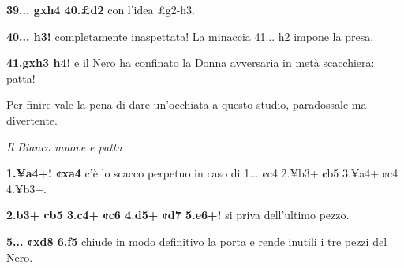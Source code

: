 \textbf{39... gxh4 40.£d2} con l'idea £g2-h3.

\textbf{40... h3!} completamente inaspettata! La minaccia 41... h2
impone la presa.

\textbf{41.gxh3 h4!} e il Nero ha confinato la Donna avversaria in metà
scacchiera: patta!

Per finire vale la pena di dare un'occhiata a questo studio, paradossale
ma divertente.


\emph{Il Bianco muove e patta}

\textbf{1.¥a4+! ¢xa4} c'è lo scacco perpetuo in caso di 1... ¢c4 2.¥b3+
¢b5 3.¥a4+ ¢c4 4.¥b3+.

\textbf{2.b3+ ¢b5 3.c4+ ¢c6 4.d5+ ¢d7 5.e6+!} si priva dell'ultimo
pezzo.

\textbf{5... ¢xd8 6.f5} chiude in modo definitivo la porta e rende
inutili i tre pezzi del Nero.
